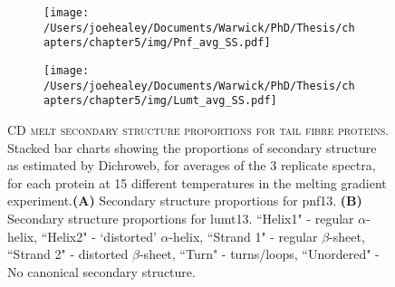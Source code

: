 \begin{figure}[p]

	\vspace{-0.2cm}
	\centering
	\begin{subfigure}{\textwidth}
	\texttt{[image: /Users/joehealey/Documents/Warwick/PhD/Thesis/chapters/chapter5/img/Pnf\_avg\_SS.pdf]}
	\captionsetup{singlelinecheck=off, justification=centering, font=footnotesize, aboveskip=7pt}
	\caption{}
	\label{pnfss}
	\end{subfigure}
	
	\begin{subfigure}{\textwidth}
	\texttt{[image: /Users/joehealey/Documents/Warwick/PhD/Thesis/chapters/chapter5/img/Lumt\_avg\_SS.pdf]}
	\captionsetup{singlelinecheck=off, justification=centering, font=footnotesize, aboveskip=7pt}
	\caption{}
	\label{lumtss}
	\end{subfigure}
	
	\captionsetup{singlelinecheck=off, justification=justified, font=footnotesize, aboveskip=8pt}
	\caption[PVC Tail fibre secondary structure proportions across the melting gradient]{\textsc{\normalsize CD melt secondary structure proportions for tail fibre proteins.} \vspace{0.1cm} \newline Stacked bar charts showing the proportions of secondary structure as estimated by Dichroweb, for averages of the 3 replicate spectra, for each protein at 15 different temperatures in the melting gradient experiment.\textbf{(A)} Secondary structure proportions for pnf13. \textbf{(B)} Secondary structure proportions for lumt13. ``Helix1" - regular $\alpha$-helix, ``Helix2" - `distorted' $\alpha$-helix, ``Strand 1" - regular $\beta$-sheet, ``Strand 2" - distorted $\beta$-sheet, ``Turn" - turns/loops, ``Unordered" - No canonical secondary structure.}
	\label{tailfibresbars}
\end{figure}

\newpage
